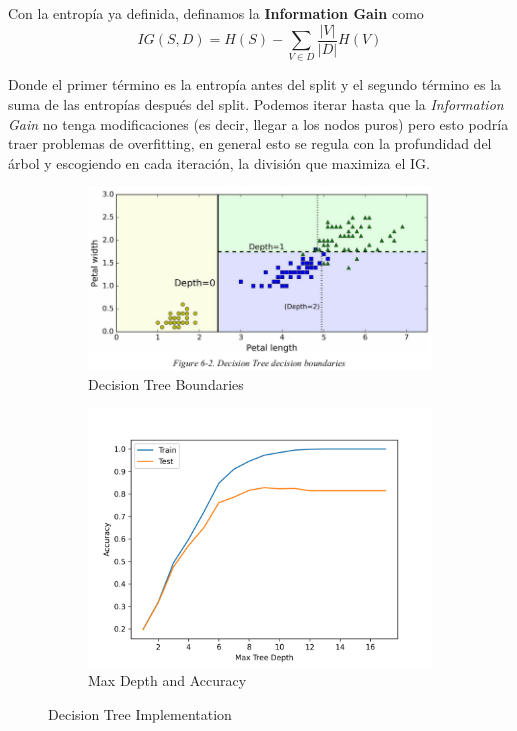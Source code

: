 Con la entropía ya definida, definamos la \textbf{Information Gain} como 
$$IG(S,D) = H(S) - \sum_{V \in D}\frac{|V|}{|D|}H(V)$$

Donde el primer término es la entropía antes del split y el segundo término es la suma de las entropías después del split. Podemos iterar hasta que la \textit{Information Gain} no tenga modificaciones (es decir, llegar a los nodos puros) pero esto podría traer problemas de overfitting, en general esto se regula con la profundidad del árbol y escogiendo en cada iteración, la división que maximiza el IG. 

\begin{figure}[H]
\begin{subfigure}{.5\textwidth}
    \center
    \includegraphics[scale=0.3]{notebooks/ML/img/decision_tree_data.png}
    \caption{Decision Tree Boundaries}
\end{subfigure}%
\begin{subfigure}{.5\textwidth}
    \center
    \includegraphics[scale=0.4]{notebooks/ML/img/max_depth_decision_tree.png}
    \caption{Max Depth and Accuracy}
\end{subfigure}
\caption{Decision Tree Implementation}
\label{fig:fig}
\end{figure}


